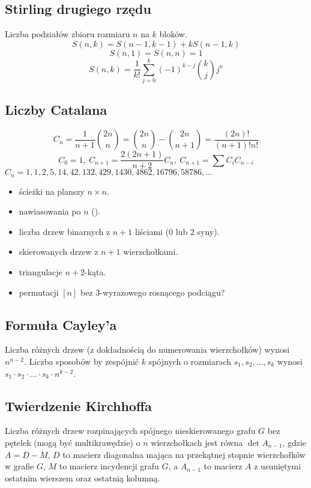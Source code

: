 	\subsection{Stirling drugiego rzędu}
		Liczba podziałów zbioru rozmiaru $n$ na $k$ bloków.
		$$S(n,k) = S(n-1,k-1) + k S(n-1,k)$$
		$$S(n,1) = S(n,n) = 1$$
		$$S(n,k) = \frac{1}{k!}\sum_{j=0}^k (-1)^{k-j}\binom{k}{j}j^n$$

	\subsection{Liczby Catalana}
		\[ C_n=\frac{1}{n+1}\binom{2n}{n}= \binom{2n}{n}-\binom{2n}{n+1} = \frac{(2n)!}{(n+1)!n!} \]
		\[ C_0=1,\ C_{n+1} = \frac{2(2n+1)}{n+2}C_n,\ C_{n+1}=\sum C_iC_{n-i} \]
		${C_n = 1, 1, 2, 5, 14, 42, 132, 429, 1430, 4862, 16796, 58786, \dots}$

		\begin{itemize}[noitemsep]
			\item ścieżki na planszy $n\times n$.
			\item nawiasowania po $n$ ().
			\item liczba drzew binarnych z $n+1$ liściami (0 lub 2 syny).
			\item skierowanych drzew z $n+1$ wierzchołkami.
			\item triangulacje $n+2$-kąta.
			\item permutacji $[n]$ bez 3-wyrazowego rosnącego podciągu?
		\end{itemize}

		\hfil

	\subsection{Formuła Cayley'a}
		Liczba różnych drzew (z dokładnością do numerowania wierzchołków) wynosi $n^{n-2}$.
		Liczba sposobów by zespójnić $k$ spójnych o rozmiarach $s_1, s_2, \dots, s_k$ wynosi $s_1 \cdot s_2 \cdot \dots \cdot s_k \cdot n^{k-2}$.

	\subsection{Twierdzenie Kirchhoffa}
		Liczba różnych drzew rozpinających spójnego nieskierowanego grafu $G$ bez pętelek (mogą być multikrawędzie) o $n$ wierzchołkach jest równa $\det A_{n-1}$, gdzie $A = D - M$, $D$ to macierz diagonalna mająca na przekątnej stopnie wierzchołków w grafie $G$, $M$ to macierz incydencji grafu $G$, a $A_{n-1}$ to macierz $A$ z usuniętymi ostatnim wierszem oraz ostatnią kolumną.


